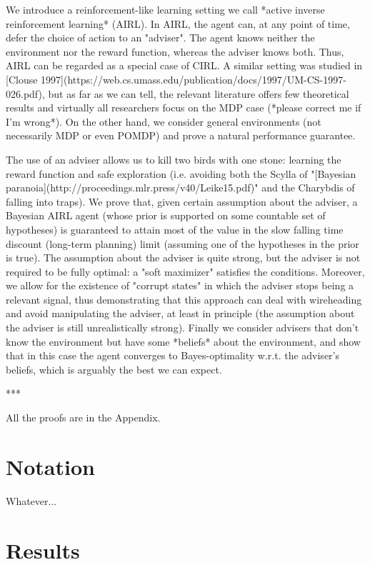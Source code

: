 \documentclass[a4paper]{article}
\begin{document}
We introduce a reinforcement-like learning setting we call *active inverse reinforcement learning* (AIRL). In AIRL, the agent can, at any point of time, defer the choice of action to an "adviser". The agent knows neither the environment nor the reward function, whereas the adviser knows both. Thus, AIRL can be regarded as a special case of CIRL. A similar setting was studied in [Clouse 1997](https://web.cs.umass.edu/publication/docs/1997/UM-CS-1997-026.pdf), but as far as we can tell, the relevant literature offers few theoretical results and virtually all researchers focus on the MDP case (*please correct me if I'm wrong*). On the other hand, we consider general environments (not necessarily MDP or even POMDP) and prove a natural performance guarantee.

The use of an adviser allows us to kill two birds with one stone: learning the reward function and safe exploration (i.e. avoiding both the Scylla of "[Bayesian paranoia](http://proceedings.mlr.press/v40/Leike15.pdf)" and the Charybdis of falling into traps). We prove that, given certain assumption about the adviser, a Bayesian AIRL agent (whose prior is supported on some countable set of hypotheses) is guaranteed to attain most of the value in the slow falling time discount (long-term planning) limit (assuming one of the hypotheses in the prior is true). The assumption about the adviser is quite strong, but the adviser is not required to be fully optimal: a "soft maximizer" satisfies the conditions. Moreover, we allow for the existence of "corrupt states" in which the adviser stops being a relevant signal, thus demonstrating that this approach can deal with wireheading and avoid manipulating the adviser, at least in principle (the assumption about the adviser is still unrealistically strong). Finally we consider advisers that don't know the environment but have some *beliefs* about the environment, and show that in this case the agent converges to Bayes-optimality w.r.t. the adviser's beliefs, which is arguably the best we can expect.

***

All the proofs are in the Appendix.

\section{Notation}

Whatever...

\section{Results}
\end{document}
